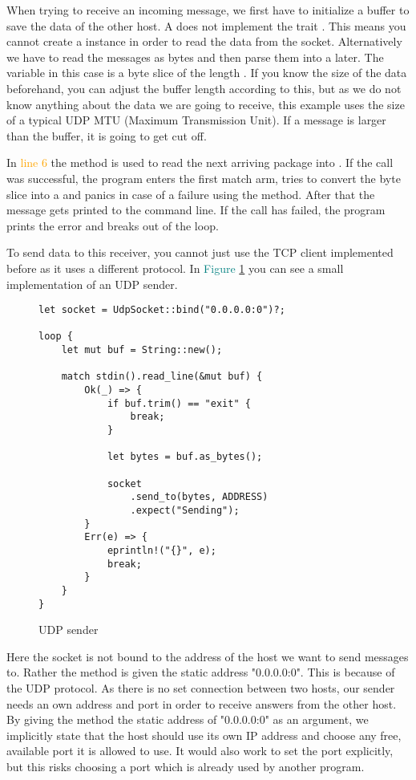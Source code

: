 When trying to receive an incoming message, we first have to initialize a buffer to save the data of the other host.
A  does not implement the trait . This means you cannot create a 
instance in order to read the data from the socket. Alternatively we have to read the messages as bytes and then parse
them into a  later. The variable  in this case is a byte slice of the length . If you
know the size of the data beforehand, you can adjust the buffer length according to this, but as we do not know
anything about the data we are going to receive, this example uses the size of a typical UDP MTU (Maximum Transmission
Unit). If a message is larger than the buffer, it is going to get cut off.

In \textcolor{orange}{line 6} the method  is used to read the next arriving package into . If
the call was successful, the program enters the first match arm, tries to convert the byte slice into a  and
panics in case of a failure using the  method. After that the message gets printed to the command line. If
the call has failed, the program prints the error and breaks out of the loop.

To send data to this receiver, you cannot just use the TCP client implemented before as it uses a different protocol. In
\textcolor{teal}{Figure \ref{udp-sender}} you can see a small implementation of an UDP sender.

\begin{figure}[ht]
    \begin{verbatim}
let socket = UdpSocket::bind("0.0.0.0:0")?;

loop {
    let mut buf = String::new();

    match stdin().read_line(&mut buf) {
        Ok(_) => {
            if buf.trim() == "exit" {
                break;
            }

            let bytes = buf.as_bytes();

            socket
                .send_to(bytes, ADDRESS)
                .expect("Sending");
        }
        Err(e) => {
            eprintln!("{}", e);
            break;
        }
    }
}
    \end{verbatim}
    \caption{UDP sender}
    \label{udp-sender}
\end{figure}

Here the socket is not bound to the address of the host we want to send messages to. Rather the  method is
given the static address "0.0.0.0:0". This is because of the UDP protocol. As there is no set connection between two
hosts, our sender needs an own address and port in order to receive answers from the other host. By giving the
 method the static address of "0.0.0.0:0" as an argument, we implicitly state that the host should use its
own IP address and choose any free, available port it is allowed to use. It would also work to set the port explicitly,
but this risks choosing a port which is already used by another program.

